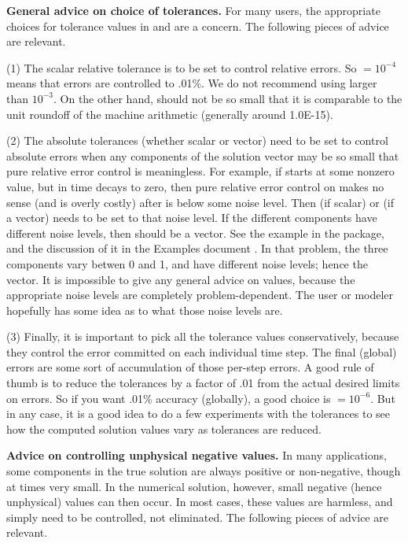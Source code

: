 {\bf General advice on choice of tolerances.}
For many users, the appropriate choices for tolerance values in
 and  are a concern.  The following pieces of
advice are relevant.

(1) The scalar relative tolerance  is to be set to control relative
errors.  So  $= 10^{-4}$ means that errors are controlled to .01\%.
We do not recommend using  larger than $10^{-3}$.  On the other hand,
 should not be so small that it is comparable to the unit roundoff
of the machine arithmetic (generally around 1.0E-15).

(2) The absolute tolerances  (whether scalar or vector) need to
be set to control absolute errors when any components of the solution
vector  may be so small that pure relative error control is
meaningless.  For example, if  starts at some nonzero value, but in time
decays to zero, then pure relative error control on  makes no sense
(and is overly costly) after  is below some noise level.  Then
 (if scalar) or  (if a vector) needs to be set to that
noise level.  If the different components have different noise levels,
then  should be a vector.  See the example  in the
{\cvodes} package, and the discussion of it in the {\cvodes} Examples document
\cite{cvodes_ex}.
In that problem, the three components vary betwen 0 and 1, and have
different noise levels; hence the  vector.  It is impossible to
give any general advice on  values, because the appropriate noise
levels are completely problem-dependent.  The user or modeler hopefully has
some idea as to what those noise levels are.

(3) Finally, it is important to pick all the tolerance values conservatively,
because they control the error committed on each individual time step.
The final (global) errors are some sort of accumulation of those
per-step errors.  A good rule of thumb is to reduce the tolerances by a
factor of .01 from the actual desired limits on errors.  So if you
want .01\% accuracy (globally), a good choice is  $= 10^{-6}$.
But in any case, it is a good idea to do a few experiments with
the tolerances to see how the computed solution values vary as
tolerances are reduced.

\vspace{0.1in}
{\bf Advice on controlling unphysical negative values.}
In many applications, some components in the true solution are always
positive or non-negative, though at times very small.  In the numerical
solution, however, small negative (hence unphysical) values can then
occur.  In most cases, these values are harmless, and simply need to
be controlled, not eliminated. The following pieces of advice are relevant.

